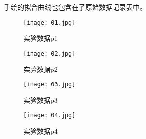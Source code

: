 \documentclass[11pt]{article}
\begin{document}
手绘的拟合曲线也包含在了原始数据记录表中。

\begin{figure}[H]
    \centering
    \caption{实验数据p1}
    \texttt{[image: 01.jpg]}
\end{figure}

\begin{figure}[H]
    \centering
    \caption{实验数据p2}
    \texttt{[image: 02.jpg]}
\end{figure}

\begin{figure}[H]
    \centering
    \caption{实验数据p3}
    \texttt{[image: 03.jpg]}
\end{figure}

\begin{figure}[H]
    \centering
    \caption{实验数据p4}
    \texttt{[image: 04.jpg]}
\end{figure}
\end{document}
